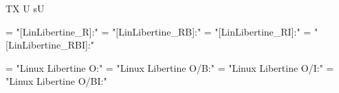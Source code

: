 


\ifx\ffdecl\undefined  \fi

 {\rm \bf \it \bi} {} {TX} {U sU}

\ismacro{}\iftrue %

   \font\tenrm = "[LinLibertine_R]:\fontfeatures"   \sizespec
   \font\tenbf = "[LinLibertine_RB]:\fontfeatures"  \sizespec
   \font\tenit = "[LinLibertine_RI]:\fontfeatures"  \sizespec
   \font\tenbi = "[LinLibertine_RBI]:\fontfeatures" \sizespec

   \def\singlefonts{%
      \font\initialfont  = "[LinLibertine_I]:\fontfeatures" \sizespec 
      \font\displayfont  = "[LinLibertine_DR]:\fontfeatures" \sizespec 
      \font\keyboardfont = "[LinBiolinum_K]:\fontfeatures" \sizespec 
   }  %

   \def\ffnamegen{"[Lin\mainfamV_\ffvarV]:\capsV\fontfeatures"} 

   \def\roman  {\ffvars{R}{RB}{RI}{RBI}\ffsetX}  \def\mainfamV{Libertine}
   \def\sans   {\ffvars{R}{RB}{RI}{RBO}\ffsetV{mainfam}{Biolinum}\ffsetX}
   \def\mono   {\ffvars{M}{MB}{MO}{MBO}\ffsetX} 
   \def\caps   {\ffsetV{caps}{+smcp}\ffsetX} 
   \def\nocaps {\ffsetX}
   \roman\nocaps\relax %

\fi

\ismacro{}\iftrue %

   \font\tenrm = "Linux Libertine O:\fontfeatures"    \sizespec
   \font\tenbf = "Linux Libertine O/B:\fontfeatures"  \sizespec
   \font\tenit = "Linux Libertine O/I:\fontfeatures"  \sizespec
   \font\tenbi = "Linux Libertine O/BI:\fontfeatures" \sizespec

   \def\singlefonts{%
      \font\initialfont  = "Linux Libertine Initials O:\fontfeatures" \sizespec 
      \font\displayfont  = "Linux Libertine Display O:\fontfeatures" \sizespec 
      \font\keyboardfont = "Linux Biolinum Keyboard O:\fontfeatures" \sizespec 
   }  %

